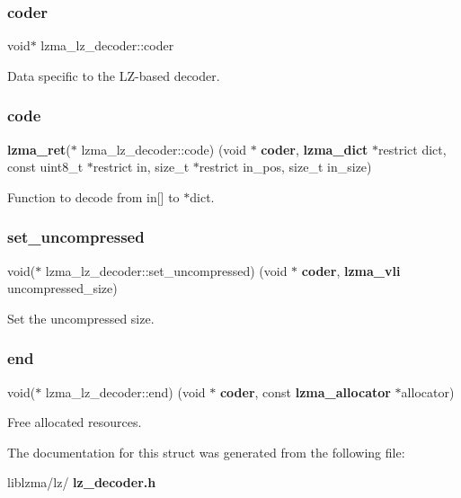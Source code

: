 \subsubsection{coder}
{\footnotesize\ttfamily void$\ast$ lzma\+\_\+lz\+\_\+decoder\+::coder}



Data specific to the L\+Z-\/based decoder. 

\mbox{\label{structlzma__lz__decoder_aeb195129f4b0e17d09c1417445bf85eb}} 
\subsubsection{code}
{\footnotesize\ttfamily \textbf{ lzma\+\_\+ret}($\ast$ lzma\+\_\+lz\+\_\+decoder\+::code) (void $\ast$\textbf{ coder}, \textbf{ lzma\+\_\+dict} $\ast$restrict dict, const uint8\+\_\+t $\ast$restrict in, size\+\_\+t $\ast$restrict in\+\_\+pos, size\+\_\+t in\+\_\+size)}



Function to decode from in[] to $\ast$dict. 

\mbox{\label{structlzma__lz__decoder_a4d75e48e1c29993b18bf7fa788cce1a1}} 
\subsubsection{set\+\_\+uncompressed}
{\footnotesize\ttfamily void($\ast$ lzma\+\_\+lz\+\_\+decoder\+::set\+\_\+uncompressed) (void $\ast$\textbf{ coder}, \textbf{ lzma\+\_\+vli} uncompressed\+\_\+size)}



Set the uncompressed size. 

\mbox{\label{structlzma__lz__decoder_abf3359e1ee6f17ae0be1aaf35fad0ab2}} 
\subsubsection{end}
{\footnotesize\ttfamily void($\ast$ lzma\+\_\+lz\+\_\+decoder\+::end) (void $\ast$\textbf{ coder}, const \textbf{ lzma\+\_\+allocator} $\ast$allocator)}



Free allocated resources. 



The documentation for this struct was generated from the following file\+:\begin{DoxyCompactItemize}
\item 
liblzma/lz/\textbf{ lz\+\_\+decoder.\+h}\end{DoxyCompactItemize}
